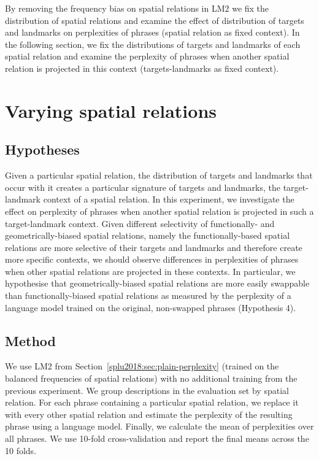 By removing the frequency bias on spatial relations in LM2 we fix the
distribution of spatial relations and examine the effect of
distribution of targets and landmarks on perplexities of phrases
(spatial relation as fixed context). In the following section, we fix
the distributions of targets and landmarks of each spatial relation
and examine the perplexity of phrases when another spatial relation is
projected in this context (targets-landmarks as fixed context).





\section{Varying spatial relations}\label{splu2018:sec:swapability}



\subsection{Hypotheses}

Given a particular spatial relation, the distribution of targets and
landmarks that occur with it creates a particular signature of targets
and landmarks, the target-landmark context of a spatial relation. In
this experiment, we investigate the effect on perplexity of phrases
when another spatial relation is projected in such a target-landmark
context. Given different selectivity of functionally- and
geometrically-biased spatial relations, namely the functionally-based
spatial relations are more selective of their targets and landmarks
and therefore create more specific contexts, we should observe
differences in perplexities of phrases when other spatial relations
are projected in these contexts. In particular, we hypothesise that
geometrically-biased spatial relations are more easily swappable than
functionally-biased spatial relations as measured by the perplexity of
a language model trained on the original, non-swapped phrases
(Hypothesis 4).











\subsection{Method}

We use %
LM2 from Section~\ref{splu2018:sec:plain-perplexity} (trained on the balanced
frequencies of spatial relations) with no additional training from the
previous experiment. We group descriptions in the evaluation set by
spatial relation. For each phrase containing a particular spatial
relation, we replace it with every other spatial relation and estimate
the perplexity of the resulting phrase using a language
model. Finally, we calculate the mean of perplexities over all
phrases. We use 10-fold cross-validation and report the final means
across the 10 folds.







